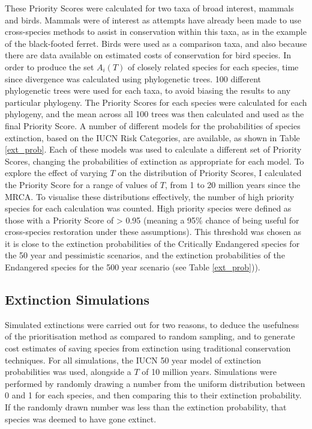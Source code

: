 \documentclass[12pt]{article}
\begin{document}
	These Priority Scores were calculated for two taxa of broad interest,
	mammals and birds. Mammals were of interest as attempts have already been made to use
	cross-species methods to assist in conservation within this taxa, as in the example of the
	black-footed ferret. Birds were used as a comparison taxa, and also because there are data
	available on estimated costs of conservation for bird species. In order to produce the set $A_i(T)$
	of closely related species for each species, time since divergence was calculated using phylogenetic
	trees. 100 different phylogenetic trees were used for each taxa, to avoid biasing the results to any
	particular phylogeny. %
	The Priority Scores for each species were calculated for each phylogeny,
	and the mean across all 100 trees was then calculated and used as the final
	Priority Score. A number of different models for the probabilities of species
	extinction, based on the IUCN Risk Categories, are available, as shown in Table \ref{ext_prob}.
	Each of these models was used to
	calculate a different set of Priority Scores, changing the probabilities of extinction as
	appropriate for each model. To explore the effect of varying $T$ on the distribution of Priority
	Scores, I calculated the Priority Score for a range of values of $T$, from 1
	to 20 million years since the MRCA. To visualise these distributions effectively,
	the number of high priority species for each calculation was counted. High priority
	species were defined as those with a Priority Score of > 0.95 (meaning a 95\%
	chance of being useful for cross-species restoration under these assumptions).
	This threshold was chosen as it is close to the extinction probabilities
	of the Critically Endangered species for the 50 year and pessimistic scenarios,
	and the extinction probabilities of the Endangered species for the 500 year
	scenario (see Table \ref{ext_prob})).
	
	\subsection{Extinction Simulations}\label{sim_methods}
	Simulated extinctions were carried out for two reasons, to deduce the usefulness of the prioritisation
	method as compared to random sampling, and to generate cost estimates of saving species from
	extinction using traditional conservation techniques. For all simulations, the IUCN 50
	year model of extinction probabilities \citep{mooersConvertingEndangeredSpecies2008} was used, alongside
	a $T$ of 10 million years. Simulations were performed by randomly drawing a number from the 
	uniform distribution between 0 and 1 for each species,
	and then comparing this to their extinction probability. If the randomly drawn number 
	was less than the extinction probability, that species was deemed to have gone extinct.
	
\end{document}
